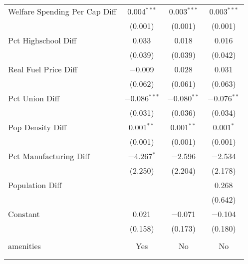 \begin{table}[!htbp]
\begin{tabular}{@{\extracolsep{5pt}}lccc}
  Welfare Spending Per Cap Diff & 0.004$^{***}$ & 0.003$^{***}$ & 0.003$^{***}$ \\ 
  & (0.001) & (0.001) & (0.001) \\ 
  Pct Highschool Diff & 0.033 & 0.018 & 0.016 \\ 
  & (0.039) & (0.039) & (0.042) \\ 
  Real Fuel Price Diff & $-$0.009 & 0.028 & 0.031 \\ 
  & (0.062) & (0.061) & (0.063) \\ 
  Pct Union Diff & $-$0.086$^{***}$ & $-$0.080$^{**}$ & $-$0.076$^{**}$ \\ 
  & (0.031) & (0.036) & (0.034) \\ 
  Pop Density Diff & 0.001$^{**}$ & 0.001$^{**}$ & 0.001$^{*}$ \\ 
  & (0.001) & (0.001) & (0.001) \\ 
  Pct Manufacturing Diff & $-$4.267$^{*}$ & $-$2.596 & $-$2.534 \\ 
  & (2.250) & (2.204) & (2.178) \\ 
  Population Diff &  &  & 0.268 \\ 
  &  &  & (0.642) \\ 
  Constant & 0.021 & $-$0.071 & $-$0.104 \\ 
  & (0.158) & (0.173) & (0.180) \\ 
 \hline \\[-1.8ex] 
amenities & Yes & No & No \\ 
\hline \\[-1.8ex] 
\hline 
\hline \\[-1.8ex] 
\end{tabular} 
\end{table} 
